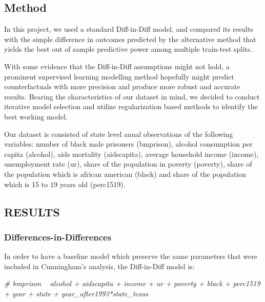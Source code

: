 \documentclass[
]{article}
\newenvironment{Shaded}{\begin{snugshade}}{\end{snugshade}}
\newcommand{\CommentTok}[1]{\textcolor[rgb]{0.56,0.35,0.01}{\textit{#1}}}
\begin{document}
\hypertarget{method}{%
\subsection{Method}\label{method}}

In this project, we used a standard Diff-in-Diff model, and compared its
results with the simple difference in outcomes predicted by the
alternative method that yields the best out of sample predictive power
among multiple train-test splits.

With some evidence that the Diff-in-Diff assumptions might not hold, a
prominent supervised learning modelling method hopefully might predict
counterfactuals with more precision and produce more robust and accurate
results. Bearing the characteristics of our dataset in mind, we decided
to conduct iterative model selection and utilize regularization based
methods to identify the best working model.

Our dataset is consisted of state level anual observations of the
following variables: number of black male prisoners (bmprison), alcohol
consumption per capita (alcohol), aids mortality (aidscapita), average
household income (income), unemployment rate (ur), share of the
population in poverty (poverty), share of the population which is
african american (black) and share of the population which is 15 to 19
years old (perc1519).

\hypertarget{results}{%
\subsection{RESULTS}\label{results}}

\hypertarget{differences-in-differences}{%
\subsubsection{Differences-in-Differences}\label{differences-in-differences}}

In order to have a baseline model which preserve the same parameters
that were included in Cunningham's analysis, the Diff-in-Diff model is:

\begin{Shaded}
\begin{Highlighting}[]
\CommentTok{# bmprison ~ alcohol + aidscapita + income + ur + poverty + black + perc1519 + year + state + year_after1993*state_texas}
\end{Highlighting}
\end{Shaded}
\end{document}
